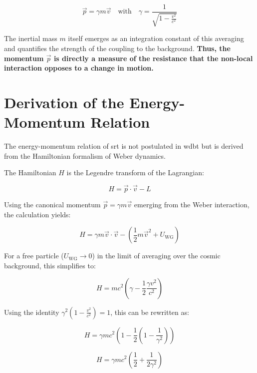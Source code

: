 \begin{equation}
    \vec{p} = \gamma m \vec{v} \quad \text{with} \quad \gamma = \frac{1}{\sqrt{1 - \frac{v^2}{c^2}}}
\end{equation}

The inertial mass $m$ itself emerges as an integration constant of this averaging and quantifies the strength of the coupling to the background. \textbf{Thus, the momentum $\vec{p}$ is directly a measure of the resistance that the non-local interaction opposes to a change in motion.}

\section{Derivation of the Energy-Momentum Relation}
The energy-momentum relation of \gls{srt} is not postulated in \gls{wdbt} but is derived from the Hamiltonian formalism of Weber dynamics.

The Hamiltonian $H$ is the Legendre transform of the Lagrangian:

\begin{equation}
    H = \vec{p} \cdot \vec{v} - L
\end{equation}

Using the canonical momentum $\vec{p} = \gamma m \vec{v}$ emerging from the Weber interaction, the calculation yields:

\begin{equation}
    H = \gamma m \vec{v} \cdot \vec{v} - \left( \frac{1}{2}m\vec{v}^2 + U_{\mathrm{WG}} \right)
\end{equation}

For a free particle ($U_\text{WG} \to 0$) in the limit of averaging over the cosmic background, this simplifies to:

\begin{equation}
    H = m c^2 \left( \gamma - \frac{1}{2} \frac{\gamma v^2}{c^2} \right)
\end{equation}

Using the identity $\gamma^2 \left(1 -  \frac{v^2}{c^2}\right) = 1$, this can be rewritten as:

\begin{equation}
    H = \gamma m c^2 \left( 1 - \frac{1}{2} \left(1 - \frac{1}{\gamma^2}\right) \right)
\end{equation}

\begin{equation}
    H = \gamma m c^2 \left( \frac{1}{2} + \frac{1}{2\gamma^2} \right)
\end{equation}

